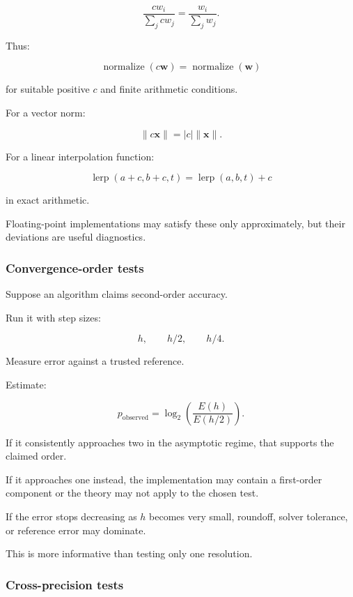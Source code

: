 \[ \frac{cw_i}{\sum_jcw_j} = \frac{w_i}{\sum_jw_j}. \]

Thus:

\[ \boxed{ \operatorname{normalize}(c\mathbf w) = \operatorname{normalize}(\mathbf w) } \]

for suitable positive \(c\) and finite arithmetic conditions.

For a vector norm:

\[ \boxed{ \|c\mathbf x\|=|c|\|\mathbf x\| }. \]

For a linear interpolation function:

\[ \boxed{ \operatorname{lerp}(a+c,b+c,t) = \operatorname{lerp}(a,b,t)+c } \]

in exact arithmetic.

Floating-point implementations may satisfy these only approximately, but their deviations are useful diagnostics.

\subsubsection{Convergence-order tests}\label{02-foundations-ii-ch031-convergence-order-tests}

\hypertarget{02-foundations-ii-ch031-convergence-order-tests}{}

Suppose an algorithm claims second-order accuracy.

Run it with step sizes:

\[ h,\qquad h/2,\qquad h/4. \]

Measure error against a trusted reference.

Estimate:

\[ p_{\mathrm{observed}} = \log_2 \left( \frac{E(h)}{E(h/2)} \right). \]

If it consistently approaches two in the asymptotic regime, that supports the claimed order.

If it approaches one instead, the implementation may contain a first-order component or the theory may not apply to the chosen test.

If the error stops decreasing as \(h\) becomes very small, roundoff, solver tolerance, or reference error may dominate.

This is more informative than testing only one resolution.

\subsubsection{Cross-precision tests}\label{02-foundations-ii-ch031-cross-precision-tests}

